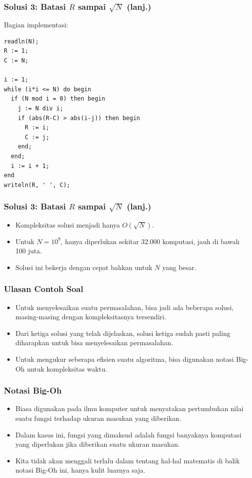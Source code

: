 \documentclass{beamer}
\begin{document}
\begin{frame}[fragile]
\frametitle{Solusi 3: Batasi $R$ sampai $\sqrt{N}$ (lanj.)}
Bagian implementasi:
\begin{lstlisting}
readln(N);
R := 1;
C := N;

i := 1;
while (i*i <= N) do begin
  if (N mod i = 0) then begin
    j := N div i;
    if (abs(R-C) > abs(i-j)) then begin
      R := i;
      C := j;
    end;
  end;
  i := i + 1;
end
writeln(R, ' ', C);
\end{lstlisting}
\end{frame}

\begin{frame}[fragile]
\frametitle{Solusi 3: Batasi $R$ sampai $\sqrt{N}$ (lanj.)}
\begin{itemize}
    \item Kompleksitas solusi menjadi hanya $O(\sqrt{N})$.
    \item Untuk $N = 10^9$, hanya diperlukan sekitar 32.000 komputasi, jauh di bawah 100 juta.
    \item Solusi ini bekerja dengan cepat bahkan untuk $N$ yang besar.
\end{itemize}
\end{frame}

\begin{frame}
\frametitle{Ulasan Contoh Soal}
\begin{itemize}
    \item Untuk menyelesaikan suatu permasalahan, bisa jadi ada beberapa solusi, masing-masing dengan kompleksitasnya tersendiri.
    \item Dari ketiga solusi yang telah dijelaskan, solusi ketiga sudah pasti paling diharapkan untuk bisa menyelesaikan permasalahan.
    \item Untuk mengukur seberapa efisien suatu algoritma, bisa digunakan notasi Big-Oh untuk kompleksitas waktu.
\end{itemize}
\end{frame}

\begin{frame}
\frametitle{Notasi Big-Oh}
\begin{itemize}
    \item Biasa digunakan pada ilmu komputer untuk menyatakan pertumbuhan nilai suatu fungsi terhadap ukuran masukan yang diberikan.
    \item Dalam kasus ini, fungsi yang dimaksud adalah fungsi banyaknya komputasi yang diperlukan jika diberikan suatu ukuran masukan.
    \item Kita tidak akan menggali terlalu dalam tentang hal-hal matematis di balik notasi Big-Oh ini, hanya kulit luarnya saja.
\end{itemize}
\end{frame}
\end{document}
